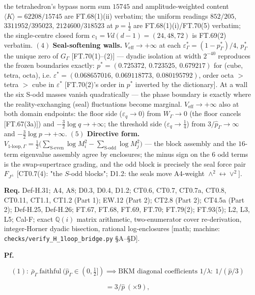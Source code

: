 \begin{theorem}
the tetrahedron's bypass norm sum $15745$ and amplitude-weighted content $\langle K\rangle=62208/15745$ are FT.68(1)(ii) verbatim; the uniform readings $852/205$, $3311952/395023$, $2124600/318523$ at $p=\tfrac12$ are FT.68(1)(i)/FT.70(5) verbatim; the single-centre closed form $c_1=Vd(d-1)=(24,48,72)$ is FT.69(2) verbatim. $(4)$ \textbf{Seal-softening walls.} $V_{\mathrm{eff}}\to+\infty$ at each $\varepsilon^*_\Gamma=(1-p^*_\Gamma)/4$, $p^*_\Gamma$ the unique zero of $G_\Gamma$ [FT.70(1)–(2)] — dyadic isolation at width $2^{-40}$ reproduces the frozen boundaries exactly: $p^*=(0.725372,\ 0.723525,\ 0.679217)$ for (cube, tetra, octa), i.e. $\varepsilon^*=(0.068657016,\ 0.069118773,\ 0.080195792)$, order octa $>$ tetra $>$ cube in $\varepsilon^*$ [FT.70(2)'s order in $p^*$ inverted by the dictionary]. At a wall the six S-odd masses vanish quadratically — the phase boundary is exactly where the reality-exchanging (seal) fluctuations become marginal. $V_{\mathrm{eff}}\to+\infty$ also at both domain endpoints: the floor side ($\varepsilon_q\to0$) from $W_\Gamma\to0$ (the floor cancels [FT.67(3a)]) and $-\tfrac32\log q\to+\infty$; the threshold side ($\varepsilon_q\to\tfrac14$) from $3/\hat p_\Gamma\to\infty$ and $-\tfrac32\log p\to+\infty$. $(5)$ \textbf{Directive form.} $V_{\text{1-loop},\Gamma}=\tfrac12\bigl(\sum_{\text{S-even}}\log M_i^2-\sum_{\text{S-odd}}\log M_j^2\bigr)$ — the block assembly and the $16$-term eigenvalue assembly agree by enclosures; the minus sign on the $6$ odd terms is the swap-supertrace grading, and the odd block is precisely the seal force pair $F_{J^\pm}$ [CT0.7(4): "the $S$-odd blocks"; D1.2: the seals move A4-weight $\wedge^2\!\leftrightarrow\!\vee^2$].

\textbf{Req.} Def-H.31; A4, A8; D0.3, D0.4, D1.2; CT0.6, CT0.7, CT0.7a, CT0.8, CT0.11, CT1.1, CT1.2 (Part 1); EW.12 (Part 2); CT2.8 (Part 2); CT4.5a (Part 2); Def-H.25, Def-H.26; FT.67, FT.68, FT.69, FT.70; FT.79(2); FT.93(5); L2, L3, L5; Cal-F; exact $\mathbb Q(i)$ matrix arithmetic, two-enumerator cover re-derivation, integer-Horner dyadic bisection, rational log-enclosures [math; machine: \texttt{checks/\allowbreak{}verify\_\allowbreak{}H\_\allowbreak{}1loop\_\allowbreak{}bridge.py} §A–§D].

\textbf{Pf.}

\[
(1):\ \bar\rho_\Gamma\ \text{faithful}\ (\hat p_\Gamma\in(0,\tfrac12])\implies\text{BKM diagonal coefficients }1/\lambda:\ 1/(\hat p/3)
\]

\[
= 3/\hat p\ (\times9),
\]


\end{theorem}
